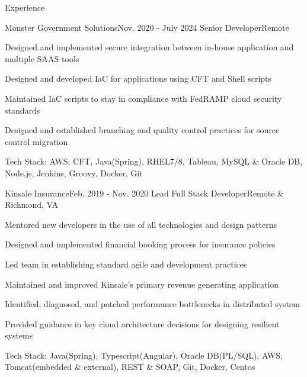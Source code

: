 \documentclass{resume} %
\begin{document}

\begin{rSection}{\vspace{-1em}Experience}

	\begin{rSubsection}{Monster Government Solutions}{Nov. 2020 - July 2024}
			{Senior Developer}{Remote}
		\item Designed and implemented secure integration between in-house application and multiple SAAS tools
		\item Designed and developed IaC for applications using CFT and Shell scripts
		\item Maintained IaC scripts to stay in compliance with FedRAMP cloud security standards
		\item Designed and established branching and quality control practices for source control migration
		\item Tech Stack: AWS, CFT, Java(Spring), RHEL7/8, Tableau, MySQL \& Oracle DB, Node.js, Jenkins, Groovy, Docker, Git
	\end{rSubsection}\vspace{-0.5em}
	
	\begin{rSubsection}{Kinsale Insurance}{Feb. 2019 - Nov. 2020}
			{Lead Full Stack Developer}{Remote \& Richmond, VA}
		\item Mentored new developers in the use of all technologies and design patterns
		\item Designed and implemented financial booking process for insurance policies
		\item Led team in establishing standard agile and development practices
	    \item Maintained and improved Kinsale's primary revenue generating application
		\item Identified, diagnosed, and patched performance bottlenecks in distributed system
		\item Provided guidance in key cloud architecture decisions for designing resilient systems
		\item Tech Stack: Java(Spring), Typescript(Angular), Oracle DB(PL/SQL), AWS, Tomcat(embedded \& external), REST \& SOAP, Git, Docker, Centos
	\end{rSubsection}\vspace{-0.5em}



\end{rSection}
\end{document}
